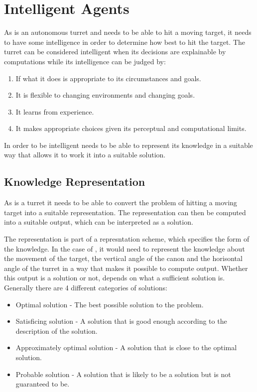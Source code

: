 \section{Intelligent Agents}

As \name is an autonomous turret and needs to be able to hit a moving target,
it needs to have some intelligence in order to determine how best to hit the
target. The turret can be considered intelligent when its decisions
are explainable by computations while its intelligence can be judged by:

\begin{enumerate}
  \item If what it does is appropriate to its circumstances and goals.
  \item It is flexible to changing environments and changing goals.
  \item It learns from experience.
  \item It makes appropriate choices given its perceptual and computational
  limits.
\end{enumerate}


In order to be intelligent \name needs to be able to represent its knowledge in
a suitable way that allows it to work it into a suitable solution.

\subsection{Knowledge Representation}

As \name is a turret it needs to be able to convert the problem of hitting a
moving target into a suitable representation. The representation can then be
computed into a suitable output, which can be interpreted as a solution.


The representation is part of a represntation scheme, which specifies the form
of the knowledge. In the case of \name, it would need to represent the knowledge
about the movement of the target, the vertical angle of the canon and the
horisontal angle of the turret in a way that makes it possible to compute
output. Whether this output is a solution or not, depends on what a sufficient
solution is. Generally there are 4 different categories of solutions:

\begin{itemize}
  \item Optimal solution - The best possible solution to the problem.
  \item Satisficing solution - A solution that is good enough according to the
  description of the solution.
  \item Approximately optimal solution - A solution that is close to the optimal
  solution.
  \item Probable solution - A solution that is likely to be a solution but is
  not guaranteed to be.
\end{itemize}

